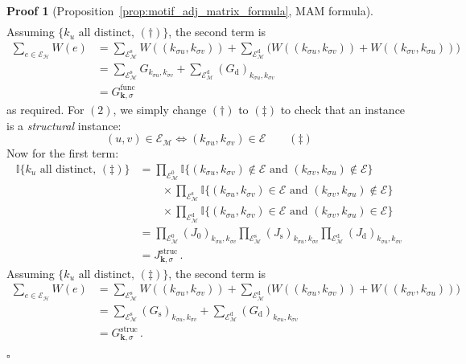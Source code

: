 \documentclass[12pt]{ociamthesis}
\theoremstyle{plain}
\theoremstyle{definition}
\newtheorem{prf}{Proof}[chapter]
\theoremstyle{remark}
\newcommand\bb[1]{\mathbb{#1}}
\newcommand\ca[1]{\mathcal{#1}}
\begin{document}
\begin{prf}[Proposition~\ref{prop:motif_adj_matrix_formula}, MAM formula]
\begin{align*}
  \end{align*}
  Assuming $\big\{ k_u \textrm{ all distinct}, \, (\dagger) \big\}$, the second
  term is
  \begin{align*}
    \sum_{e \in \ca{E_H}} W(e)
    &= \sum_{\ca{E}_\ca{M}^\mathrm{s}} W((k_{\sigma u},k_{\sigma v}))
    + \sum_{\ca{E}_\ca{M}^\mathrm{d}} \big( W((k_{\sigma u},k_{\sigma v})) +
    W((k_{\sigma v},k_{\sigma u})) \big) \\
    &= \sum_{\ca{E}_\ca{M}^\mathrm{s}} G_{k_{\sigma u},k_{\sigma v}}
    + \sum_{\ca{E}_\ca{M}^\mathrm{d}} (G_\mathrm{d})_{k_{\sigma u},k_{\sigma
    v}} \\
    &= G^\mathrm{func}_{\mathbf{k},\sigma}
  \end{align*}
  as required. For $(2)$, we simply change $(\dagger)$ to $(\ddagger)$ to check
  that an instance is a \emph{structural} instance:
  $$ (u,v) \in \ca{E_M} \iff (k_{\sigma u}, k_{\sigma v}) \in \ca{E} \qquad
  (\ddagger) $$
  Now for the first term:
  \begin{align*}
    \bb{I} \big\{ k_u \textrm{ all distinct}, \, (\ddagger) \big\}
    &= \prod_{\ca{E}_\ca{M}^0} \bb{I} \{(k_{\sigma u}, k_{\sigma v}) \notin
    \ca{E} \textrm{ and } (k_{\sigma v}, k_{\sigma u}) \notin \ca{E}\} \\
    & \qquad \times \prod_{\ca{E}_\ca{M}^\mathrm{s}} \bb{I} \{(k_{\sigma u},
      k_{\sigma v}) \in \ca{E} \textrm{ and } (k_{\sigma v}, k_{\sigma u})
      \notin
    \ca{E}\} \\
    & \qquad \times \prod_{\ca{E}_\ca{M}^\mathrm{d}} \bb{I} \{(k_{\sigma u},
      k_{\sigma v}) \in \ca{E} \textrm{ and } (k_{\sigma v}, k_{\sigma u}) \in
    \ca{E}\} \\
    &= \prod_{\ca{E}_\ca{M}^0} (J_\mathrm{0})_{k_{\sigma u},k_{\sigma v}}
    \prod_{\ca{E}_\ca{M}^\mathrm{s}} (J_\mathrm{s})_{k_{\sigma u},k_{\sigma v}}
    \prod_{\ca{E}_\ca{M}^\mathrm{d}} (J_\mathrm{d})_{k_{\sigma u},k_{\sigma v}}
    \\
    &= J^\mathrm{struc}_{\mathbf{k},\sigma}\,.
  \end{align*}
  Assuming $\big\{ k_u \textrm{ all distinct}, \, (\ddagger) \big\}$, the
  second term is
  \begin{align*}
    \sum_{e \in \ca{E_H}} W(e)
    &= \sum_{\ca{E}_\ca{M}^\mathrm{s}} W((k_{\sigma u},k_{\sigma v}))
    + \sum_{\ca{E}_\ca{M}^\mathrm{d}} \big( W((k_{\sigma u},k_{\sigma v})) +
    W((k_{\sigma v},k_{\sigma u})) \big) \\
    &= \sum_{\ca{E}_\ca{M}^\mathrm{s}} (G_\mathrm{s})_{k_{\sigma u},k_{\sigma
    v}}
    + \sum_{\ca{E}_\ca{M}^\mathrm{d}} (G_\mathrm{d})_{k_{\sigma u},k_{\sigma
    v}} \\
    &= G^\mathrm{struc}_{\mathbf{k},\sigma}\,.
  \end{align*}

  \hfill $\square$
\end{prf}
\end{document}

